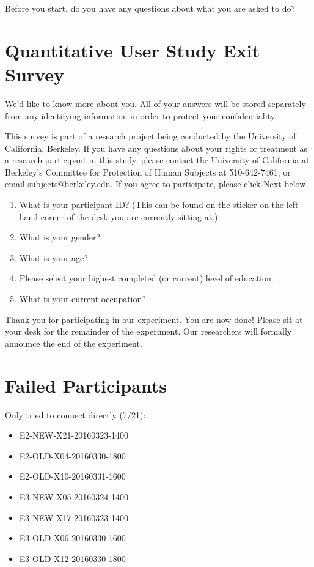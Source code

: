 \documentclass[USenglish,oneside,twocolumn]{article}
\begin{document}
Before you start, do you have any questions about what you are asked to do? 

\section{Quantitative User Study Exit Survey} 
\label{quantitative-exit-survey}
We'd like to know more about you.  All of your answers will be stored separately from any identifying information in order to protect your confidentiality.

This survey is part of a research project being conducted by the University of California, Berkeley. If you have any questions about your rights or treatment as a research participant in this study, please contact the University of California at Berkeley's Committee for Protection of Human Subjects at 510-642-7461, or email subjects@berkeley.edu. If you agree to participate, please click Next below.\\

\begin{enumerate}
\item{What is your participant ID? (This can be found on the sticker on the left hand corner of the desk you are currently sitting at.)}
\item{What is your gender?}
\item{What is your age?}
\item{Please select your highest completed (or current) level of education}.
\item{What is your current occupation?}  
\end{enumerate}

Thank you for participating in our experiment. You are now done! Please sit at your desk for the remainder of the experiment. Our researchers will formally announce the end of the experiment. 

\section{Failed Participants} 
\label{failed-participants}

Only tried to connect directly (7/21): 
\begin{itemize}
\item E2-NEW-X21-20160323-1400
\item E2-OLD-X04-20160330-1800
\item E2-OLD-X10-20160331-1600
\item E3-NEW-X05-20160324-1400
\item E3-NEW-X17-20160323-1400
\item E3-OLD-X06-20160330-1600
\item E3-OLD-X12-20160330-1800
\end{itemize} 
\end{document}
